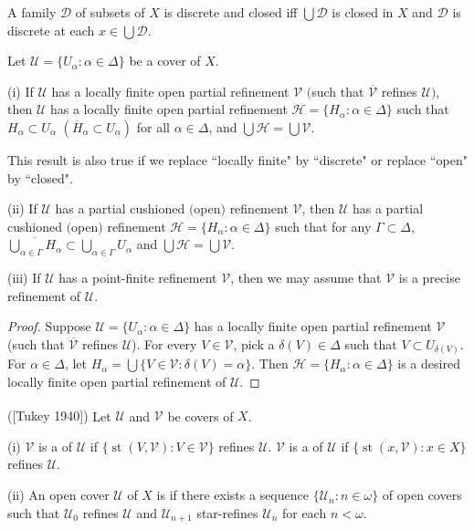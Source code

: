 \documentclass[prelim.tex]{subfiles}
\begin{document}
{\lemma{} \label{lem:1.1.4}
	A family $\mathscr{D}$ of subsets of $X$ is discrete and closed iff $\bigcup \mathscr{D}$ is closed in $X$ and $\mathscr{D}$ is discrete at each $x \in \bigcup \mathscr{D}$. 
	\hfill \qedsymbol
} %

{\lemma{} \label{lem:1.1.5}
	Let $\mathscr{U} = \{U_\alpha: \alpha \in \Delta\}$ be a cover of $X$. 
	
\textup{(i)} If $\mathscr{U}$ has a locally finite open partial refinement $\mathscr{V}$ 
$($such that $\overline{\mathscr{V}}$ refines $\mathscr{U})$, 
then $\mathscr{U}$ has a locally finite 
	 open partial refinement $\mathscr{H} = \{H_\alpha: \alpha \in \Delta\}$ such that
	  $H_\alpha \subset U_\alpha$ $(\overline{H}_\alpha \subset U_\alpha)$ 
	  for all $\alpha \in \Delta$, and 
	  $\bigcup \mathscr{H} = \bigcup \mathscr{V}$.  
	  
This result is also true if we replace ``locally finite" by ``discrete" 
or replace ``open" by ``closed".

\textup{(ii)} If $\mathscr{U}$ has a partial cushioned $($open$)$ refinement $\mathscr{V}$, then $\mathscr{U}$ has a partial cushioned $($open$)$  refinement $\mathscr{H} = \{H_\alpha: \alpha \in \Delta\}$ such that for any $\Gamma \subset \Delta$, $\overline{\bigcup_{\alpha \in \Gamma} H_\alpha} \subset \bigcup_{\alpha \in \Gamma} U_\alpha$ and $\bigcup \mathscr{H} = \bigcup \mathscr{V}$.  

\textup{(iii)} If $\mathscr{U}$ has a point-finite refinement $\mathscr{V}$, then we may assume that
$\mathscr{V}$ is a precise refinement of $\mathscr{U}$.
} %

\begin{proof} Suppose $\mathscr{U} = \{U_\alpha: \alpha \in \Delta\}$ has a locally finite open partial refinement $\mathscr{V}$ (such that 
$\overline{\mathscr{V}}$ refines $\mathscr{U}$). For every $V\in\mathscr{V}$, pick 
a $\delta(V)\in\Delta$ such that $V\subset U_{\delta(V)}$. For $\alpha \in \Delta$, let
$H_\alpha = \bigcup\{V\in\mathscr{V}: \delta(V) = \alpha\}$.   
Then $\mathscr{H} = \{H_\alpha: \alpha \in \Delta\}$ is a desired 
locally finite open partial refinement of $\mathscr{U}$.
\end{proof} 

{ \label{def:1.1.6}
\textup{([Tukey 1940]\textsuperscript{\cite{Tukey}})}
Let $\mathscr{U}$ and $\mathscr{V}$ be covers of $X$.
	
	\textup{(i)} $\mathscr{V}$ is a 
	of $\mathscr{U}$ if 
	$\{\operatorname{st}(V, \mathscr{V}): V\in \mathscr{V}\}$ refines $\mathscr{U}$.
$\mathscr{V}$ is a 
of $\mathscr{U}$ if 
$\{\operatorname{st}(x, \mathscr{V}): x\in X\}$ refines $\mathscr{U}$.
	
	\textup{(ii)} An open cover $\mathscr{U}$ of $X$ is 
	if there exists a sequence $\{ \mathscr{U}_n: n\in\omega\}$ of open covers such that $\mathscr{U}_0$ refines $\mathscr{U}$ and $\mathscr{U}_{n+1}$ star-refines $\mathscr{U}_n$ for each $n<\omega$.
}%
\end{document}
